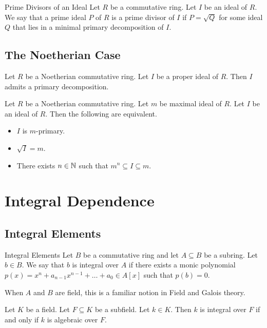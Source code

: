 \documentclass[a4paper]{article}
\begin{document}
\begin{defn}{Prime Divisors of an Ideal}{} Let $R$ be a commutative ring. Let $I$ be an ideal of $R$. We say that a prime ideal $P$ of $R$ is a prime divisor of $I$ if $P=\sqrt{Q}$ for some ideal $Q$ that lies in a minimal primary decomposition of $I$. 
\end{defn}

\subsection{The Noetherian Case}
\begin{thm}{}{} Let $R$ be a Noetherian commutative ring. Let $I$ be a proper ideal of $R$. Then $I$ admits a primary decomposition. 
\end{thm}

\begin{prp}{}{} Let $R$ be a Noetherian commutative ring. Let $m$ be maximal ideal of $R$. Let $I$ be an ideal of $R$. Then the following are equivalent. 
\begin{itemize}
\item $I$ is $m$-primary. 
\item $\sqrt{I}=m$. 
\item There exists $n\in\mathbb{N}$ such that $m^n\subseteq I\subseteq m$. 
\end{itemize}
\end{prp}

\pagebreak
\section{Integral Dependence}
\subsection{Integral Elements}
\begin{defn}{Integral Elements}{} Let $B$ be a commutative ring and let $A\subseteq B$ be a subring. Let $b\in B$. We say that $b$ is integral over $A$ if there exists a monic polynomial $p(x)=x^n+a_{n-1}x^{n-1}+\dots+a_0\in A[x]$ such that $p(b)=0$. 
\end{defn}

When $A$ and $B$ are field, this is a familiar notion in Field and Galois theory. 

\begin{lmm}{}{} Let $K$ be a field. Let $F\subseteq K$ be a subfield. Let $k\in K$. Then $k$ is integral over $F$ if and only if $k$ is algebraic over $F$. 
\end{lmm}
\end{document}
